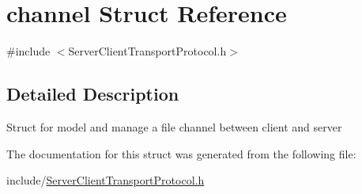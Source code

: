 \hypertarget{structchannel}{}\section{channel Struct Reference}
\label{structchannel}


{\ttfamily \#include $<$Server\+Client\+Transport\+Protocol.\+h$>$}



\subsection{Detailed Description}
Struct for model and manage a file channel between client and server 

The documentation for this struct was generated from the following file\+:\begin{DoxyCompactItemize}
\item 
include/\hyperlink{_server_client_transport_protocol_8h}{Server\+Client\+Transport\+Protocol.\+h}\end{DoxyCompactItemize}
